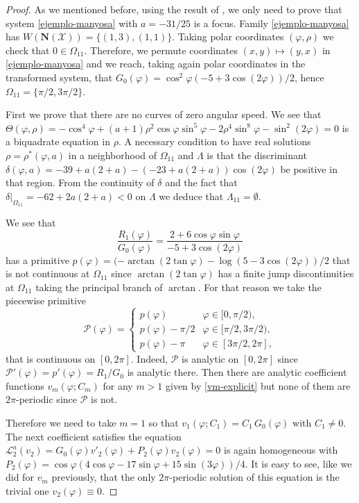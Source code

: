 \documentclass[12pt]{amsart}
\begin{document}
\begin{proof}
As we mentioned before, using the result of \cite{Ma}, we only need to prove that system \eqref{ejemplo-manyosa} with $a = -31/25$ is a focus. Family \eqref{ejemplo-manyosa} has $W(\mathbf{N}(\mathcal{X})) = \{ (1, 3), (1, 1) \}$. Taking polar coordinates $(\varphi, \rho)$ we check that $0 \in \Omega_{11}$. Therefore, we permute coordinates $(x,y) \mapsto (y,x)$ in \eqref{ejemplo-manyosa} and we reach, taking again polar coordinates in the transformed system, that $G_0(\varphi) = \cos^2\varphi (-5 + 3 \cos( 2\varphi))/2$, hence $\Omega_{11} = \{\pi/2, 3 \pi/2\}$.

First we prove that there are no curves of zero angular speed. We see that $\Theta(\varphi, \rho) = - \cos^4\varphi + (a+1) \rho^2 \cos\varphi \sin^5\varphi - 2 \rho^4 \sin^8\varphi - \sin^2(2\varphi) = 0$ is a biquadrate equation in $\rho$. A necessary condition to have real solutions $\rho=\rho^*(\varphi, a)$ in a neighborhood of $\Omega_{11}$ and $\Lambda$ is that the discriminant $\delta(\varphi, a) = -39 + a (2 + a) - (-23 + a (2 + a)) \cos(2\varphi)$ be positive in that region. From the continuity of $\delta$ and the fact that $\delta|_{\Omega_{11}} = -62 + 2 a (2 + a) < 0$ on $\Lambda$ we deduce that $\Lambda_{11} = \emptyset$.

We see that
$$
\frac{R_1(\varphi)}{G_0(\varphi)}= \frac{2 + 6 \cos\varphi \sin\varphi}{-5 + 3 \cos(2\varphi)}
$$
has a primitive $p(\varphi) = (-\arctan(2 \tan\varphi) - \log(5 - 3 \cos(2 \varphi))/2$ that is not continuous at $\Omega_{11}$ since $\arctan(2 \tan\varphi)$ has a finite jump discontinuities at $\Omega_{11}$ taking the principal branch of $\arctan$. For that reason we take the piecewise primitive
$$
\mathcal{P}(\varphi) = \begin{cases}
p(\varphi) & \varphi \in [0, \pi/2), \\
p(\varphi)-  \pi/2 & \varphi \in [\pi/2, 3\pi/2), \\
p(\varphi) - \pi & \varphi \in [3\pi/2, 2\pi],
\end{cases}
$$
that is continuous on $[0, 2 \pi]$. Indeed, $\mathcal{P}$ is analytic on $[0, 2 \pi]$ since $\mathcal{P}'(\varphi) = p'(\varphi) = R_1/G_0$ is analytic there. Then there are analytic coefficient functions $v_m(\varphi; C_m)$ for any $m > 1$ given by \eqref{vm-explicit} but none of them are $2 \pi$-periodic since $\mathcal{P}$ is not.

Therefore we need to take $m=1$ so that $v_1(\varphi; C_1) = C_1 \, G_0(\varphi)$ with $C_1 \neq 0$. The next coefficient satisfies the equation $\mathcal{L}^{a}_2(v_2) = G_0(\varphi) v'_2(\varphi) + P_2(\varphi) v_2(\varphi) = 0$ is again homogeneous with $P_2(\varphi) = \cos\varphi (4 \cos\varphi - 17 \sin\varphi + 15 \sin(3\varphi))/4$. It is easy to see, like we did for $v_m$ previously, that the only $2 \pi$-periodic solution of this equation is the trivial one $v_2(\varphi) \equiv 0$.


\end{proof}
\end{document}
